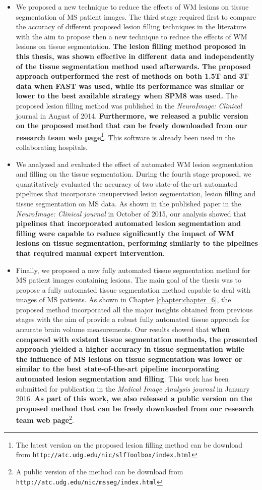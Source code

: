 \begin{itemize}
\item We proposed a new technique to reduce the effects of WM lesions on tissue segmentation of MS patient images. The third stage required first to compare the accuracy of different proposed lesion filling techniques in the literature with the aim to propose then a new technique to reduce the effects of WM lesions on tissue segmentation. \textbf{The lesion filling method proposed in this thesis, was shown effective in different data and independently of the tissue segmentation method used afterwards. The proposed approach outperformed the rest of methods on both 1.5T and 3T data when FAST was used, while its performance was similar or lower to the best available strategy when SPM8 was used.} The proposed lesion filling method was  published in the\textit{ NeuroImage: Clinical} journal in August of 2014. \textbf{Furthermore, we released a public version on the proposed method that can be freely downloaded from our research team web page}\footnote{The latest version on the proposed lesion filling method can be download from \texttt{http://atc.udg.edu/nic/slfToolbox/index.html}}. This software is already been used in the collaborating hospitals.  

\item We analyzed and evaluated the effect of automated WM lesion segmentation and filling on the tissue segmentation. During the fourth stage proposed, we quantitatively evaluated the accuracy of two state-of-the-art automated pipelines that incorporate unsupervised lesion segmentation, lesion filling and tissue segmentation on MS data.  As shown in the published paper in the \textit{NeuroImage: Clinical journal} in October of 2015, our analysis showed that \textbf{pipelines that incorporated automated lesion segmentation and filling were capable to reduce significantly the impact of WM lesions on tissue segmentation, performing similarly to the pipelines that required manual expert intervention}.


\item Finally, we proposed a new fully automated tissue segmentation method for MS patient images containing lesions. The main goal of the thesis was to propose a fully automated tissue segmentation method capable to deal with images of MS patients. As shown in Chapter \ref{chapter:chapter_6}, the proposed method incorporated all the major insights obtained from previous stages with the aim of provide a robust fully automated tissue approach for accurate brain volume measurements. Our results showed that  \textbf{when compared with existent tissue segmentation methods, the presented approach yielded a higher accuracy in tissue segmentation while the influence of MS lesions on tissue segmentation was lower or similar to the best state-of-the-art pipeline incorporating automated lesion segmentation and filling}. This work has been submitted for publication in the\textit{ Medical Image Analysis journal }in January 2016. \textbf{As part of this work, we also released a public version on the proposed method that can be freely downloaded from our research team web page}\footnote{A public version of the method can be download from \texttt{http://atc.udg.edu/nic/msseg/index.html}}.


\end{itemize}
